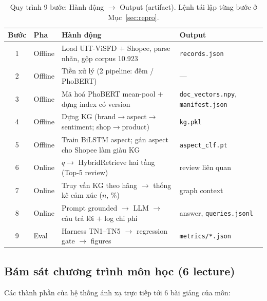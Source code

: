 \documentclass[12pt,a4paper]{article}
\begin{document}
\begin{table}[H]
\centering\small
\caption{Quy trình 9 bước: Hành động $\to$ Output (artifact). Lệnh tái lập từng bước ở Mục~\ref{sec:repro}.}
\renewcommand{\arraystretch}{1.2}
\begin{tabular}{cp{1.3cm}p{6.6cm}p{3.5cm}}
\toprule
\textbf{Bước} & \textbf{Pha} & \textbf{Hành động} & \textbf{Output} \\
\midrule
1 & Offline & Load UIT-ViSFD $+$ Shopee, parse nhãn, gộp corpus 10.923 & \texttt{records.json} \\
2 & Offline & Tiền xử lý (2 pipeline: đếm / PhoBERT) & --- \\
3 & Offline & Mã hoá PhoBERT mean-pool $+$ dựng index có version & \texttt{doc\_vectors.npy}, \texttt{manifest.json} \\
4 & Offline & Dựng KG (brand$\to$aspect$\to$sentiment; shop$\to$product) & \texttt{kg.pkl} \\
5 & Offline & Train BiLSTM aspect; gán aspect cho Shopee làm giàu KG & \texttt{aspect\_clf.pt} \\
6 & Online & $q\to$ HybridRetrieve hai tầng (Top-5 review) & review liên quan \\
7 & Online & Truy vấn KG theo hãng $\to$ thống kê cảm xúc ($n$, \%) & graph context \\
8 & Online & Prompt grounded $\to$ LLM $\to$ câu trả lời $+$ log chi phí & answer, \texttt{queries.jsonl} \\
9 & Eval & Harness TN1--TN5 $\to$ regression gate $\to$ figures & \texttt{metrics/*.json} \\
\bottomrule
\end{tabular}
\end{table}

\subsection{Bám sát chương trình môn học (6 lecture)}

Các thành phần của hệ thống ánh xạ trực tiếp tới 6 bài giảng của môn:
\end{document}
